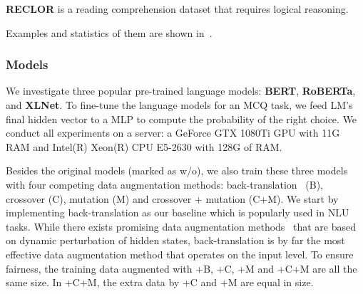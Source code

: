 \textbf{RECLOR} is a reading comprehension dataset that requires logical reasoning.

Examples and statistics of them are shown in~. 

\subsubsection{Models}
We investigate three popular pre-trained language models: \textbf{BERT}, \textbf{RoBERTa}, and \textbf{XLNet}. 
To fine-tune the language models for an MCQ task, we feed LM's final hidden
vector to a MLP to compute the probability of the right choice.
We conduct all experiments on a server: 
a GeForce GTX 1080Ti GPU with 11G RAM and Intel(R) Xeon(R) CPU E5-2630 with 128G of RAM.

%
%
%
Besides the original models (marked as w/o), we also train these three
models with four competing data augmentation methods: 
back-translation~\cite{back2019} (B),  crossover (C), mutation (M)
and crossover + mutation (C+M). 
We start by implementing back-translation as our baseline which is 
popularly used in NLU tasks. While there exists promising data augmentation methods~\cite{qu2020coda,chen-etal-2021-hiddencut} that are based on dynamic perturbation of hidden states, back-translation is by far the most
effective data augmentation method that operates on the input level.
To ensure fairness, the training data augmented with +B, +C, +M and +C+M are
all the same size. In +C+M, the extra data by +C and +M are equal in size.

